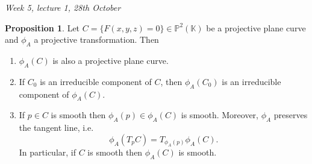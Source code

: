 \documentclass{article}
\newcommand{\K}{\mathbb{K}}
\newcommand{\p}{\mathbb{P}}
\theoremstyle{definition}
\newtheorem{prop}[defn]{Proposition}
\begin{document}
\begin{flushright}
\textit{Week 5, lecture 1, 28th October}
\end{flushright}

\begin{prop}
Let $C=\{F(x,y,z)=0\}\in\p^2(\K)$ be a projective plane curve and $\phi_A$ a projective transformation. Then
\begin{enumerate}
\item $\phi_A(C)$ is also a projective plane curve.
\item If $C_0$ is an irreducible component of $C$, then $\phi_A(C_0)$ is an irreducible component of $\phi_A(C)$.
\item If $p\in C$ is smooth then $\phi_A(p)\in\phi_A(C)$ is smooth. Moreover, $\phi_A$ preserves the tangent line, i.e.
\[
\phi_A(T_pC)=T_{\phi_A(p)}\phi_A(C).
\]
In particular, if $C$ is smooth then $\phi_A(C)$ is smooth.
\end{enumerate}
\end{prop}
\end{document}
